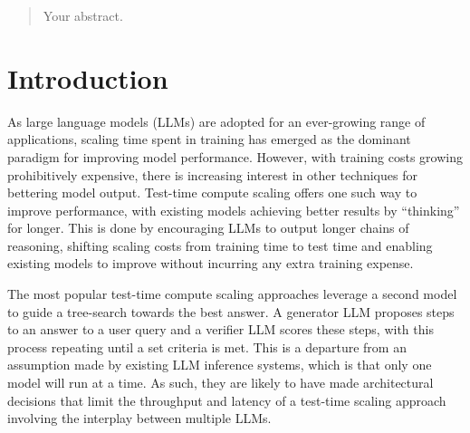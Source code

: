 \documentclass[12pt,twoside]{report}
\begin{document}



\clearpage{\pagestyle{empty}\cleardoublepage}
\setcounter{page}{1}
\pagestyle{fancy}

\begin{abstract}
Your abstract.
\end{abstract}

\cleardoublepage

\tableofcontents 


\setcounter{page}{1}
\fancyhead[LE,RO]{\slshape \rightmark}
\fancyhead[LO,RE]{\slshape \leftmark}

\chapter{Introduction} %

As large language models (LLMs) are adopted for an ever-growing range of applications, scaling time spent in training has emerged as the dominant paradigm for improving model performance.
However, with training costs growing prohibitively expensive, there is increasing interest in other techniques for bettering model output. 
Test-time compute scaling offers one such way to improve performance, with existing models achieving better results by ``thinking'' for longer.
This is done by encouraging LLMs to output longer chains of reasoning, shifting scaling costs from training time to test time and enabling existing models to improve without incurring any extra training expense.

The most popular test-time compute scaling approaches leverage a second model to guide a tree-search towards the best answer.
A generator LLM proposes steps to an answer to a user query and a verifier LLM scores these steps, with this process repeating until a set criteria is met. 
This is a departure from an assumption made by existing LLM inference systems, which is that only one model will run at a time.
As such, they are likely to have made architectural decisions that limit the throughput and latency of a test-time scaling approach involving the interplay between multiple LLMs.
\end{document}

